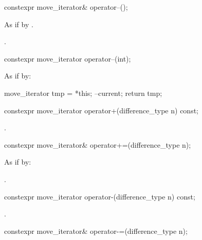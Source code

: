 %
\begin{itemdecl}
constexpr move_iterator& operator--();
\end{itemdecl}

\begin{itemdescr}
\pnum
\effects
As if by .

\pnum
\returns
{}.
\end{itemdescr}

%
\begin{itemdecl}
constexpr move_iterator operator--(int);
\end{itemdecl}

\begin{itemdescr}
\pnum
\effects
As if by:
\begin{codeblock}
move_iterator tmp = *this;
--current;
return tmp;
\end{codeblock}
\end{itemdescr}

%
\begin{itemdecl}
constexpr move_iterator operator+(difference_type n) const;
\end{itemdecl}

\begin{itemdescr}
\pnum
\returns
{}.
\end{itemdescr}

%
\begin{itemdecl}
constexpr move_iterator& operator+=(difference_type n);
\end{itemdecl}

\begin{itemdescr}
\pnum
\effects
As if by: 

\pnum
\returns
{}.
\end{itemdescr}

%
\begin{itemdecl}
constexpr move_iterator operator-(difference_type n) const;
\end{itemdecl}

\begin{itemdescr}
\pnum
\returns
{}.
\end{itemdescr}

%
\begin{itemdecl}
constexpr move_iterator& operator-=(difference_type n);
\end{itemdecl}

